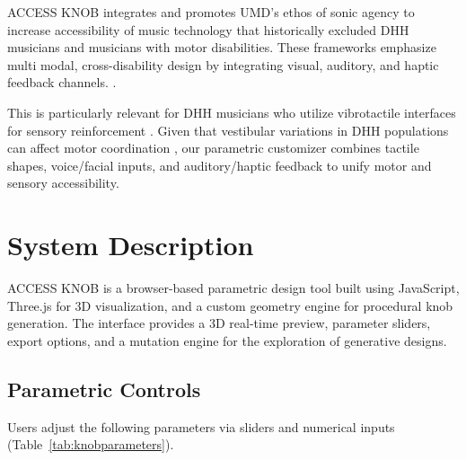 \documentclass[manuscript,screen,review,anonymous]{acmart}
\begin{document}
ACCESS KNOB integrates and promotes UMD's ethos of sonic agency \cite{labelle2018sonic} to increase accessibility of music technology that historically excluded DHH musicians and musicians with motor disabilities. These frameworks emphasize multi modal, cross-disability design by integrating visual, auditory, and haptic feedback channels. \cite{breteche2019deaf, cavdir2022embodied}. %

This is particularly relevant for DHH musicians who utilize vibrotactile interfaces for sensory reinforcement \cite{cavdir2022touch, cavdir2020felt}. Given that vestibular variations in DHH populations can affect motor coordination \cite{wink2018balance, erkilicc2011conceptual}, our parametric customizer combines tactile shapes, voice/facial inputs, and auditory/haptic feedback to unify motor and sensory accessibility.

\section{System Description}

ACCESS KNOB is a browser-based parametric design tool built using JavaScript, Three.js for 3D visualization, and a custom geometry engine for procedural knob generation. The interface provides a 3D real-time preview, parameter sliders, export options, and a mutation engine for the exploration of generative designs.

\subsection{Parametric Controls}
Users adjust the following parameters via sliders and numerical inputs (Table~\ref{tab:knobparameters}).



\end{document}
